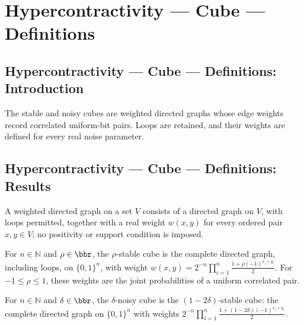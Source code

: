 \section{Hypercontractivity --- Cube --- Definitions}
\subsection*{Hypercontractivity --- Cube --- Definitions: Introduction}
The stable and noisy cubes are weighted directed graphs whose edge weights record correlated uniform-bit pairs. Loops are retained, and their weights are defined for every real noise parameter.

\subsection*{Hypercontractivity --- Cube --- Definitions: Results}

\begin{definition}
\leanok
A weighted directed graph on a set $V$ consists of a directed graph on $V$, with loops permitted, together with a real weight $w(x,y)$ for every ordered pair $x,y\in V$; no positivity or support condition is imposed.
\end{definition}

\begin{definition}
\leanok
{}
For $n\in\mathbb N$ and $\rho\in\bbr$, the $\rho$-stable cube is the complete directed graph, including loops, on $\{0,1\}^n$, with weight $w(x,y)=2^{-n}\prod_{i=1}^n\frac{1+\rho(-1)^{x_i+y_i}}{2}$. For $-1\le\rho\le1$, these weights are the joint probabilities of a uniform correlated pair.
\end{definition}

\begin{definition}
\leanok
{}
For $n\in\mathbb N$ and $\delta\in\bbr$, the $\delta$-noisy cube is the $(1-2\delta)$-stable cube: the complete directed graph on $\{0,1\}^n$ with weights $2^{-n}\prod_{i=1}^n\frac{1+(1-2\delta)(-1)^{x_i+y_i}}{2}$.
\end{definition}
